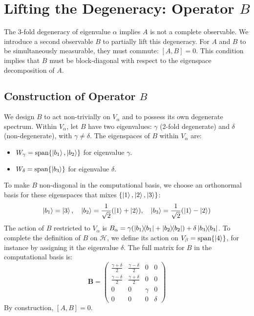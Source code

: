 \documentclass[11pt,a4paper]{article}
\begin{document}
\section{Lifting the Degeneracy: Operator \texorpdfstring{$B$}{B}}

The 3-fold degeneracy of eigenvalue $\alpha$ implies $A$ is not a complete observable. We introduce a second observable $B$ to partially lift this degeneracy. For $A$ and $B$ to be simultaneously measurable, they must commute: $[A,B]=0$. This condition implies that $B$ must be block-diagonal with respect to the eigenspace decomposition of $A$.

\subsection{Construction of Operator \texorpdfstring{$B$}{B}}
We design $B$ to act non-trivially on $V_\alpha$ and to possess its own degenerate spectrum. Within $V_\alpha$, let $B$ have two eigenvalues: $\gamma$ (2-fold degenerate) and $\delta$ (non-degenerate), with $\gamma \neq \delta$.
The eigenspaces of $B$ within $V_\alpha$ are:
\begin{itemize}
    \item $W_\gamma = \text{span}\{\ket{b_1}, \ket{b_2}\}$ for eigenvalue $\gamma$.
    \item $W_\delta = \text{span}\{\ket{b_3}\}$ for eigenvalue $\delta$.
\end{itemize}
To make $B$ non-diagonal in the computational basis, we choose an orthonormal basis for these eigenspaces that mixes $\{\ket{1}, \ket{2}, \ket{3}\}$:
$$
\ket{b_1} = \ket{3}, \quad \ket{b_2} = \frac{1}{\sqrt{2}}(\ket{1}+\ket{2}), \quad \ket{b_3} = \frac{1}{\sqrt{2}}(\ket{1}-\ket{2})
$$
The action of $B$ restricted to $V_\alpha$ is $B_\alpha = \gamma(\dyad{b_1}{b_1} + \dyad{b_2}{b_2}) + \delta\dyad{b_3}{b_3}$. To complete the definition of $B$ on $\mathcal{H}$, we define its action on $V_\beta=\text{span}\{\ket{4}\}$, for instance by assigning it the eigenvalue $\delta$. The full matrix for $B$ in the computational basis is:
$$
\mathbf{B} = \begin{pmatrix}
\frac{\gamma+\delta}{2} & \frac{\gamma-\delta}{2} & 0 & 0 \\
\frac{\gamma-\delta}{2} & \frac{\gamma+\delta}{2} & 0 & 0 \\
0 & 0 & \gamma & 0 \\
0 & 0 & 0 & \delta
\end{pmatrix}
$$
By construction, $[A,B]=0$.
\end{document}
